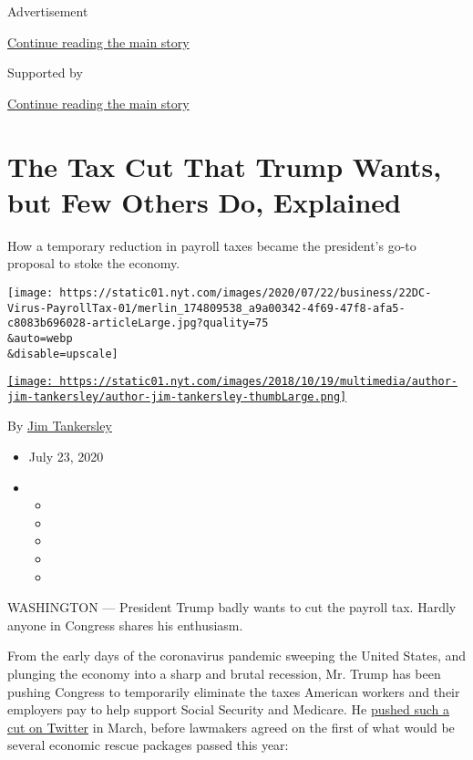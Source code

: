 Advertisement

\protect\hyperlink{after-top}{Continue reading the main story}

Supported by

\protect\hyperlink{after-sponsor}{Continue reading the main story}

\hypertarget{the-tax-cut-that-trump-wants-but-few-others-do-explained}{%
\section{The Tax Cut That Trump Wants, but Few Others Do,
Explained}\label{the-tax-cut-that-trump-wants-but-few-others-do-explained}}

How a temporary reduction in payroll taxes became the president's go-to
proposal to stoke the economy.

\texttt{[image: https://static01.nyt.com/images/2020/07/22/business/22DC-Virus-PayrollTax-01/merlin\_174809538\_a9a00342-4f69-47f8-afa5-c8083b696028-articleLarge.jpg?quality=75\\\&auto=webp\\\&disable=upscale]}

\href{https://www.nytimes.com/by/jim-tankersley}{\texttt{[image: https://static01.nyt.com/images/2018/10/19/multimedia/author-jim-tankersley/author-jim-tankersley-thumbLarge.png]}}

By \href{https://www.nytimes.com/by/jim-tankersley}{Jim Tankersley}

\begin{itemize}
\item
  July 23, 2020
\item
  \begin{itemize}
  \item
  \item
  \item
  \item
  \item
  \end{itemize}
\end{itemize}

WASHINGTON --- President Trump badly wants to cut the payroll tax.
Hardly anyone in Congress shares his enthusiasm.

From the early days of the coronavirus pandemic sweeping the United
States, and plunging the economy into a sharp and brutal recession, Mr.
Trump has been pushing Congress to temporarily eliminate the taxes
American workers and their employers pay to help support Social Security
and Medicare. He
\href{https://twitter.com/realDonaldTrump/status/1237924658185469954}{pushed
such a cut on Twitter} in March, before lawmakers agreed on the first of
what would be several economic rescue packages passed this year:

